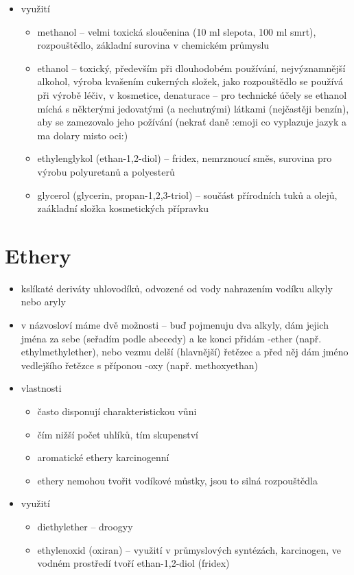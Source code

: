 \documentclass{article}
\begin{document}
\begin{itemize}
\begin{itemize}
  \end{itemize}
  \item využití
  \begin{itemize}
    \item methanol -- velmi toxická sloučenina (10 ml slepota, 100 ml smrt), rozpouštědlo, základní surovina v chemickém průmyslu
    \item ethanol -- toxický, především při dlouhodobém používání, nejvýznamnější alkohol, výroba kvašením cukerných složek, jako rozpouštědlo se používá při výrobě léčiv, v kosmetice, denaturace -- pro technické účely se ethanol míchá s některými jedovatými (a nechutnými) látkami (nejčastěji benzín), aby se zamezovalo jeho požívání (nekrať daně :emoji co vyplazuje jazyk a ma dolary misto oci:)
    \item ethylenglykol (ethan-1,2-diol) -- fridex, nemrznoucí směs, surovina pro výrobu polyuretanů a polyesterů
    \item glycerol (glycerin, propan-1,2,3-triol) -- součást přírodních tuků a olejů, zaákladní složka kosmetických přípravku
  \end{itemize}
\end{itemize}

\section{Ethery}
\begin{itemize}
  \item kslíkaté deriváty uhlovodíků, odvozené od vody nahrazením vodíku alkyly nebo aryly
  \item v názvosloví máme dvě možnosti -- buď pojmenuju dva alkyly, dám jejich jména za sebe (seřadím podle abecedy) a ke konci přidám -ether (např. ethylmethylether), nebo vezmu delší (hlavnější) řetězec a před něj dám jméno vedlejšího řetězce s příponou -oxy (např. methoxyethan)
  \item vlastnosti
  \begin{itemize}
    \item často disponují charakteristickou vůni
    \item čím nižší počet uhlíků, tím  skupenství
    \item aromatické ethery karcinogenní
    \item ethery nemohou tvořit vodíkové můstky, jsou to silná rozpouštědla
  \end{itemize}
  \item využití
  \begin{itemize}
    \item diethylether -- droogyy
    \item ethylenoxid (oxiran) -- využití v průmyslových syntézách, karcinogen, ve vodném prostředí tvoří ethan-1,2-diol (fridex)
  \end{itemize}
\end{itemize}
\end{document}
